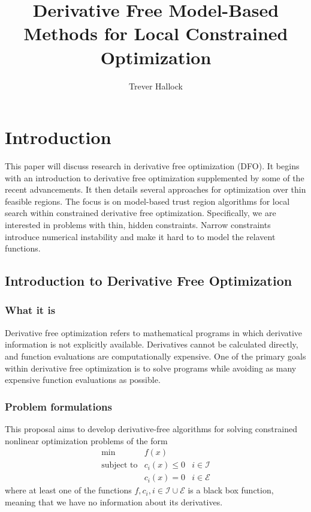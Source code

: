 \documentclass{article}
\title{Derivative Free Model-Based Methods for Local Constrained Optimization}
\author{Trever Hallock}
\begin{document}


\maketitle


\tableofcontents

\newpage

\section{Introduction}

This paper will discuss research in derivative free optimization (DFO).
It begins with an introduction to derivative free optimization \color{red}supplemented by some of the recent advancements\color{black}.
It then details several approaches for optimization over thin feasible regions.
The focus is on model-based trust region algorithms for local search within constrained derivative free optimization.
Specifically, we are interested in problems with thin, \color{red}hidden\color{black} constraints.
Narrow constraints introduce numerical instability and make it hard to to model the relavent functions.

\subsection{Introduction to Derivative Free Optimization}
\subsubsection{What it is}

Derivative free optimization refers to mathematical programs in which derivative information is not explicitly available.
Derivatives cannot be calculated directly, and function evaluations are computationally expensive.
One of the primary goals within derivative free optimization is to solve programs while avoiding as many expensive function evaluations as possible.


\subsubsection{Problem formulations}

This proposal aims to develop derivative-free algorithms for solving constrained nonlinear optimization problems of the form
\[ \begin{array}{ccl} \min & f(x) \\
\mbox{subject to} & c_i(x) \le 0 & i \in \mathcal{I} \\
& c_i(x) = 0 & i \in \mathcal{E}
\end{array}
\]
where at least one of the functions $f, c_i, i \in \mathcal{I} \cup \mathcal{E}$ is a black box function, meaning that we have no information about its derivatives.
\end{document}
